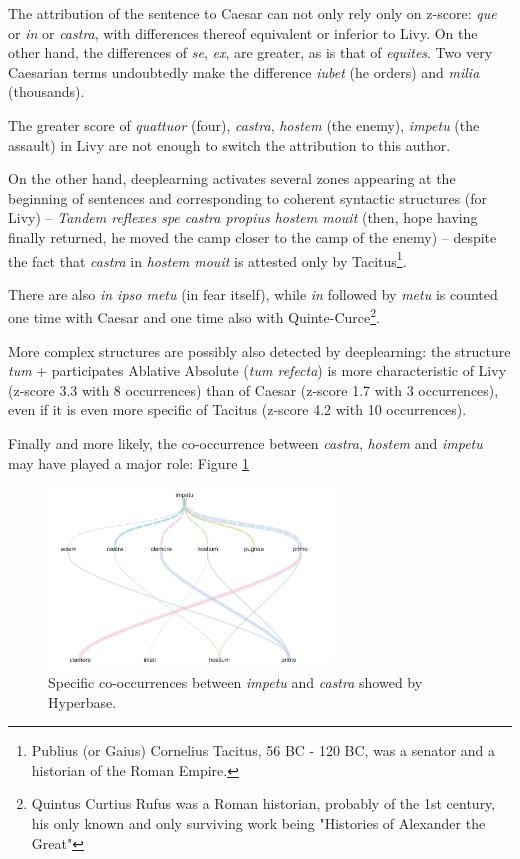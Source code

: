 The attribution of the sentence to Caesar can not only rely only on z-score: \textit{que} or \textit{in} or \textit{castra}, with differences thereof equivalent or inferior to Livy. On the other hand, the differences of \textit{se}, \textit{ex}, are greater, as is that of \textit{equites}. Two very Caesarian terms undoubtedly make the difference \textit{iubet} (he orders) and \textit{milia} (thousands).

The greater score of \textit{quattuor} (four), \textit{castra}, \textit{hostem} (the enemy), \textit{impetu} (the assault) in Livy are not enough to switch the attribution to this author.

On the other hand, deeplearning activates several zones appearing at the beginning of sentences and corresponding to coherent syntactic structures (for Livy) -- \textit{Tandem reflexes spe castra propius hostem mouit} (then, hope having finally returned, he moved the camp closer to the camp of the enemy) -- despite the fact that \textit{castra} in \textit{hostem mouit} is attested only by Tacitus\footnote{Publius (or Gaius) Cornelius Tacitus, 56 BC - 120 BC, was a senator and a historian of the Roman Empire.}. 

There are also \textit{in ipso metu} (in fear itself), while \textit{in} followed by \textit{metu} is counted one time with Caesar and one time also with Quinte-Curce\footnote{Quintus Curtius Rufus was a Roman historian, probably of the 1st century, his only known and only surviving work being "Histories of Alexander the Great"}.

More complex structures are possibly also detected by deeplearning: the structure \textit{tum} + participates Ablative Absolute (\textit{tum refecta}) is more characteristic of Livy (z-score 3.3 with 8 occurrences) than of Caesar (z-score 1.7 with 3 occurrences), even if it is even more specific of Tacitus (z-score 4.2 with 10 occurrences).

Finally and more likely, the co-occurrence between \textit{castra}, \textit{hostem} and \textit{impetu} may have played a major role: Figure \ref{latin}

\begin{figure}[h]
\begin{center}
\includegraphics[width=7.5cm]{img/cooc_latin.png}
\caption{Specific co-occurrences between \textit{impetu} and \textit{castra} showed by Hyperbase.}
\label{latin}
\end{center}
\end{figure}

